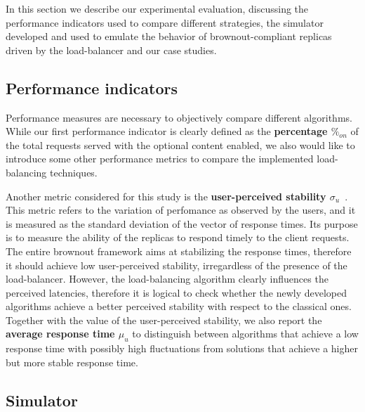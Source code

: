In this section we describe our experimental evaluation, discussing
the performance indicators used to compare different strategies, the
simulator developed and used to emulate the behavior of
brownout-compliant replicas driven by the load-balancer and our case
studies.

\subsection{Performance indicators}

Performance measures are necessary to objectively compare different
algorithms. While our first performance indicator is clearly defined
as the \textbf{percentage $\%_{on}$} of the total requests served with
the optional content enabled, we also would like to introduce some
other performance metrics to compare the implemented load-balancing
techniques.

Another metric considered for this study is the \textbf{user-perceived
  stability $\sigma_u$}~\cite{GeograficalSASO}. This metric refers to
the variation of perfomance as observed by the users, and it is
measured as the standard deviation of the vector of response
times. Its purpose is to measure the ability of the replicas to
respond timely to the client requests. The entire brownout framework
aims at stabilizing the response times, therefore it should achieve
low user-perceived stability, irregardless of the presence of the
load-balancer. However, the load-balancing algorithm clearly
influences the perceived latencies, therefore it is logical to check
whether the newly developed algorithms achieve a better perceived
stability with respect to the classical ones. Together with the value
of the user-perceived stability, we also report the \textbf{average
  response time $\mu_u$} to distinguish between algorithms that
achieve a low response time with possibly high fluctuations from
solutions that achieve a higher but more stable response time.


\subsection{Simulator}




